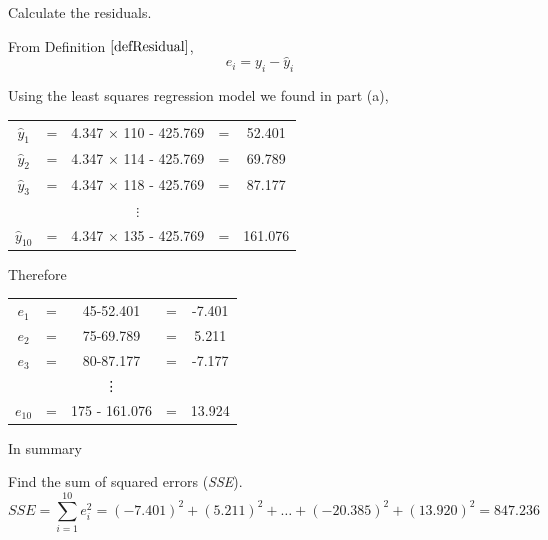 \begin{example}
\begin{benumerate}
\item Calculate the residuals.

From Definition $\ref{defResidual}$, 
\[ e_i = y_i - \hat{y}_i \]

Using the least squares regression model we found in part (a),

\begin{center}
\begin{tabular}{ccccc}
$\hat{y}_1$ &=& 4.347 $\times$ 110 - 425.769 &=& 52.401 \\
$\hat{y}_2$ &=& 4.347 $\times$ 114 - 425.769 &=& 69.789 \\
$\hat{y}_3$ &=& 4.347 $\times$ 118 - 425.769 &=& 87.177 \\
& & $\vdots$ & & \\ 
$\hat{y}_{10}$ &=& 4.347 $\times$ 135 - 425.769 &=& 161.076
\end{tabular}
\end{center}

Therefore
\begin{center}
\begin{tabular}{ccccc}
$e_1$ &=& 45-52.401 &=& -7.401 \\
$e_2$ &=& 75-69.789 &=& 5.211\\
$e_3$ &=& 80-87.177 &=& -7.177\\
& & \vdots & &\\
$e_{10}$ &=& 175 - 161.076 &=& 13.924
\end{tabular}
\end{center}

\noindent
In summary
\begin{center}
\def\arraystretch{1.5}
\end{center}

\item Find the sum of squared errors (\textit{SSE}).
\[ SSE = \sum_{i=1}^{10} e_i^2 = (-7.401)^2 + (5.211)^2 + \hdots + (-20.385)^2 + (13.920)^2 = 847.236\]


\end{benumerate}
\end{example}
